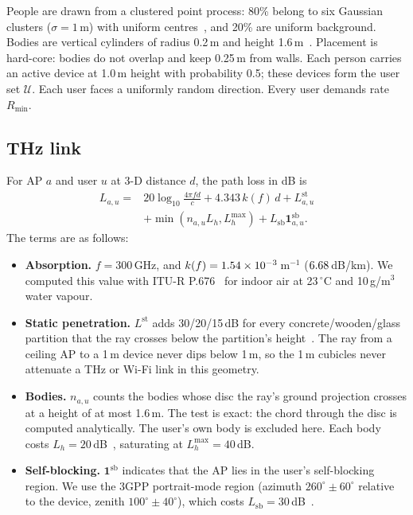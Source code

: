 \documentclass[conference]{IEEEtran}
\newcommand{\Rmin}{R_{\min}}
\begin{document}
People are drawn from a clustered point process: 80\% belong to six Gaussian clusters ($\sigma=1$\,m) with uniform centres~\cite{haenggi2012stochastic}, and 20\% are uniform background.
Bodies are vertical cylinders of radius 0.2\,m and height 1.6\,m~\cite{anon2026milp}.
Placement is hard-core: bodies do not overlap and keep 0.25\,m from walls.
Each person carries an active device at 1.0\,m height with probability 0.5; these devices form the user set $\mathcal{U}$.
Each user faces a uniformly random direction.
Every user demands rate $\Rmin$.

\subsection{THz link}
For AP $a$ and user $u$ at 3-D distance $d$, the path loss in dB is
\begin{align}
L_{a,u} ={}& 20\log_{10}\tfrac{4\pi f d}{c} + 4.343\,k(f)\,d + L^{\text{st}}_{a,u}\nonumber\\
&+ \min(n_{a,u}L_h, L_h^{\max}) + L_{\text{sb}}\mathbf{1}^{\text{sb}}_{a,u}.\label{eq:pl}
\end{align}
The terms are as follows:
\begin{itemize}
\item \textbf{Absorption.} $f=300$\,GHz, and $k(f)=1.54\times10^{-3}$\,m$^{-1}$ ($6.68$\,dB/km).
We computed this value with ITU-R P.676~\cite{itur676,iturpy} for indoor air at 23\,$^\circ$C and 10\,g/m$^3$ water vapour.
\item \textbf{Static penetration.} $L^{\text{st}}$ adds 30/20/15\,dB for every concrete/wooden/glass partition that the ray crosses below the partition's height~\cite{anon2026milp}.
The ray from a ceiling AP to a 1\,m device never dips below 1\,m, so the 1\,m cubicles never attenuate a THz or Wi-Fi link in this geometry.
\item \textbf{Bodies.} $n_{a,u}$ counts the bodies whose disc the ray's ground projection crosses at a height of at most 1.6\,m.
The test is exact: the chord through the disc is computed analytically.
The user's own body is excluded here.
Each body costs $L_h=20$\,dB~\cite{anon2026milp}, saturating at $L_h^{\max}=40$\,dB.
\item \textbf{Self-blocking.} $\mathbf{1}^{\text{sb}}$ indicates that the AP lies in the user's self-blocking region.
We use the 3GPP portrait-mode region (azimuth $260^\circ\pm60^\circ$ relative to the device, zenith $100^\circ\pm40^\circ$), which costs $L_{\text{sb}}=30$\,dB~\cite{3gpp38901}.
\end{itemize}
\end{document}
